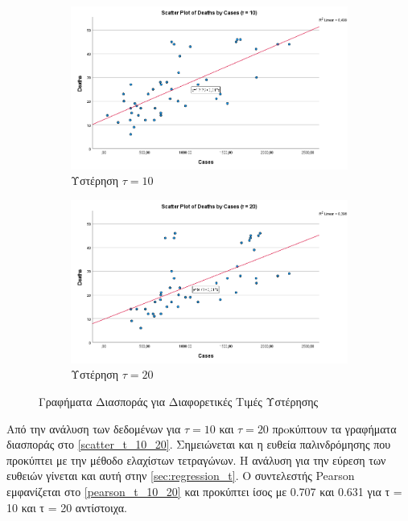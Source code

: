\documentclass{article}
\begin{document}
\begin{figure}
    \centering
    \begin{subfigure}[b]{0.8\textwidth}
        \centering
        \includegraphics[width=\textwidth]{media/2/scatter_t10.png}
        \caption{Υστέρηση $ \tau = 10 $}    
    \end{subfigure} 
    \hfill
    \begin{subfigure}[b]{0.8\textwidth}  
        \centering 
        \includegraphics[width=\textwidth]{media/2/scatter_t20.png}
        \caption{Υστέρηση $ \tau = 20 $}    
    \end{subfigure}
    \caption{Γραφήματα Διασποράς για Διαφορετικές Τιμές Υστέρησης} 
    \label{scatter_t_10_20}
\end{figure}

Από την ανάλυση των δεδομένων για $ \tau = 10 $ και $ \tau = 20 $ πρoκύπτουν τα γραφήματα διασποράς στο \autoref{scatter_t_10_20}. Σημειώνεται και η ευθεία παλινδρόμησης που προκύπτει με την μέθοδο ελαχίστων τετραγώνων. Η ανάλυση για την εύρεση των ευθειών γίνεται και αυτή στην \autoref{sec:regression_t}. Ο συντελεστής \foreignlanguage{english}{Pearson} εμφανίζεται στο \autoref{pearson_t_10_20} και προκύπτει ίσος με 0.707 και 0.631 για τ = 10 και τ = 20 αντίστοιχα.
\end{document}
